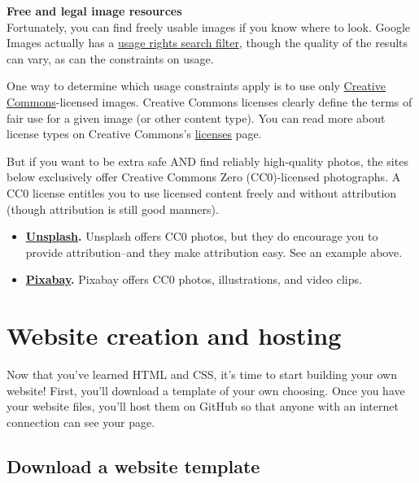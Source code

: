 \documentclass[]{book}
\providecommand{\tightlist}{%
  \setlength{\itemsep}{0pt}\setlength{\parskip}{0pt}}
\theoremstyle{definition}
\theoremstyle{definition}
\theoremstyle{definition}
\theoremstyle{remark}
\begin{document}
\textbf{Free and legal image resources}\\
Fortunately, you can find freely usable images if you know where to
look. Google Images actually has a
\href{https://support.google.com/websearch/answer/29508?hl=en}{usage
rights search filter}, though the quality of the results can vary, as
can the constraints on usage.

One way to determine which usage constraints apply is to use only
\href{https://search.creativecommons.org/}{Creative Commons}-licensed
images. Creative Commons licenses clearly define the terms of fair use
for a given image (or other content type). You can read more about
license types on Creative Commons's
\href{https://creativecommons.org/licenses/}{licenses} page.

But if you want to be extra safe AND find reliably high-quality photos,
the sites below exclusively offer Creative Commons Zero (CC0)-licensed
photographs. A CC0 license entitles you to use licensed content freely
and without attribution (though attribution is still good manners).

\begin{itemize}
\tightlist
\item
  \textbf{\href{https://unsplash.com/}{Unsplash}.} Unsplash offers CC0
  photos, but they do encourage you to provide attribution--and they
  make attribution easy. See an example above.
\item
  \textbf{\href{https://pixabay.com/}{Pixabay}.} Pixabay offers CC0
  photos, illustrations, and video clips.
\end{itemize}

\hypertarget{websites}{%
\chapter{Website creation and hosting}\label{websites}}

Now that you've learned HTML and CSS, it's time to start building your
own website! First, you'll download a template of your own choosing.
Once you have your website files, you'll host them on GitHub so that
anyone with an internet connection can see your page.

\hypertarget{download-a-website-template}{%
\section{Download a website
template}\label{download-a-website-template}}
\end{document}
